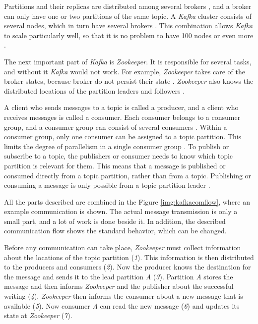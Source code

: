Partitions and their replicas are distributed among several brokers \cite[p.~17]{Stopford.2018}, and a broker can only have one or two partitions of the same topic.
A \textit{Kafka} cluster consists of several nodes, which in turn have several brokers \cite[p.~27]{Kumar.2017}.
This combination allows \textit{Kafka} to scale particularly well, so that it is no problem to have 100 nodes or even more \cite[p.~20]{Stopford.2018}.

The next important part of \textit{Kafka} is \textit{Zookeeper}.
It is responsible for several tasks, and without it \textit{Kafka} would not work.
For example, \textit{Zookeeper} takes care of the broker states, because broker do not persist their state \cite[p.~27]{Kumar.2017}\cite[p.~37f.]{Kumar.2017}.
\textit{Zookeeper} also knows the distributed locations of the partition leaders and followers \cite[p.~34]{Kumar.2017}.

A client who sends messages to a topic is called a producer, and a client who receives messages is called a consumer.
Each consumer belongs to a consumer group, and a consumer group can consist of several consumers \cite[p.~36f.]{Kumar.2017}.
Within a consumer group, only one consumer can be assigned to a topic partition.
This limits the degree of parallelism in a single consumer group \cite[p.~30f]{Kumar.2017}.
To publish or subscribe to a topic, the publishers or consumer needs to know which topic partition is relevant for them.
This means that a message is published or consumed directly from a topic partition, rather than from a topic.
Publishing or consuming a message is only possible from a topic partition leader \cite[p.~33]{Kumar.2017}\cite[p.~36]{Kumar.2017}.

All the parts described are combined in the Figure \ref{img:kafkacomflow}, where an example communication is shown.
The actual message transmission is only a small part, and a lot of work is done beside it.
In addition, the described communication flow shows the standard behavior, which can be changed.

Before any communication can take place, \textit{Zookeeper} must collect information about the locations of the topic partition (\textit{1}).
This information is then distributed to the producers and consumers (\textit{2}).
Now the producer knows the destination for the message and sends it to the lead partition \textit{A} (\textit{3}).
Partition \textit{A} stores the message and then informs \textit{Zookeeper} and the publisher about the successful writing (\textit{4}).
\textit{Zookeeper} then informs the consumer about a new message that is available (\textit{5}).
Now consumer \textit{A} can read the new message (\textit{6}) and updates its state at \textit{Zookeeper} (\textit{7}).

